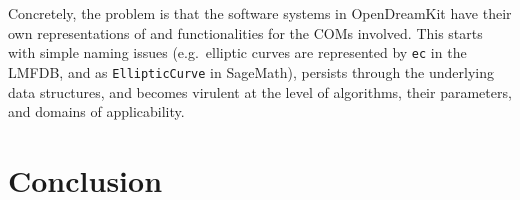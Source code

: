 \documentclass{llncs}
\def\pn{OpenDreamKit\xspace}
\begin{document}
Concretely, the problem is that the software systems in \pn have their own representations
of and functionalities for the COMs involved. This starts with simple naming issues
(e.g.\ elliptic curves are represented by \lstinline|ec| in the LMFDB, and as
\lstinline|EllipticCurve| in SageMath), persists through the underlying data structures,
and becomes virulent at the level of algorithms, their parameters, and domains of
applicability.












\section{Conclusion}
\end{document}
